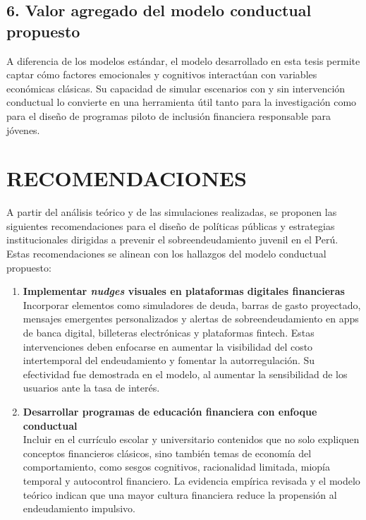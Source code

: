 \documentclass[10pt]{article}
\begin{document}
\begin{multicols}{2}
\subsection*{6. Valor agregado del modelo conductual propuesto}
A diferencia de los modelos estándar, el modelo desarrollado en esta tesis permite captar cómo factores emocionales y cognitivos interactúan con variables económicas clásicas. Su capacidad de simular escenarios con y sin intervención conductual lo convierte en una herramienta útil tanto para la investigación como para el diseño de programas piloto de inclusión financiera responsable para jóvenes.

\section{RECOMENDACIONES}

A partir del análisis teórico y de las simulaciones realizadas, se proponen las siguientes recomendaciones para el diseño de políticas públicas y estrategias institucionales dirigidas a prevenir el sobreendeudamiento juvenil en el Perú. Estas recomendaciones se alinean con los hallazgos del modelo conductual propuesto:

\begin{enumerate}
    \item \textbf{Implementar \textit{nudges} visuales en plataformas digitales financieras} \\
    Incorporar elementos como simuladores de deuda, barras de gasto proyectado, mensajes emergentes personalizados y alertas de sobreendeudamiento en apps de banca digital, billeteras electrónicas y plataformas fintech. Estas intervenciones deben enfocarse en aumentar la visibilidad del costo intertemporal del endeudamiento y fomentar la autorregulación. Su efectividad fue demostrada en el modelo, al aumentar la sensibilidad de los usuarios ante la tasa de interés.

    \item \textbf{Desarrollar programas de educación financiera con enfoque conductual} \\
    Incluir en el currículo escolar y universitario contenidos que no solo expliquen conceptos financieros clásicos, sino también temas de economía del comportamiento, como sesgos cognitivos, racionalidad limitada, miopía temporal y autocontrol financiero. La evidencia empírica revisada y el modelo teórico indican que una mayor cultura financiera reduce la propensión al endeudamiento impulsivo.


\end{enumerate}
\end{multicols}
\end{document}
